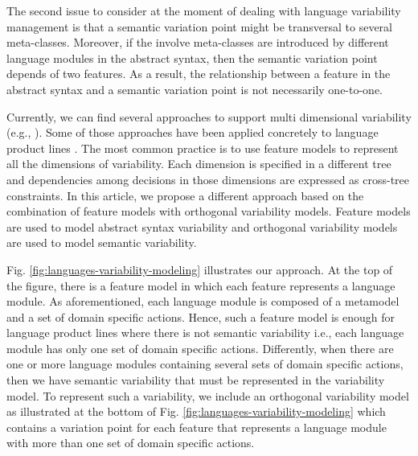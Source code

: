 The second issue to consider at the moment of dealing with language variability management is that a semantic variation point might be transversal to several meta-classes. Moreover, if the involve meta-classes are introduced by different language modules in the abstract syntax, then the semantic variation point depends of two features. As a result, the relationship between a feature in the abstract syntax and a semantic variation point is not necessarily one-to-one. 


Currently, we can find several approaches to support multi dimensional variability (e.g., \cite{Rosenmuller:2011}). Some of those approaches have been applied concretely to language product lines \cite{Liebig:2013}. The most common practice is to use feature models to represent all the dimensions of variability. Each dimension is specified in a different tree and dependencies among decisions in those dimensions are expressed as cross-tree constraints. In this article, we propose a different approach based on the combination of feature models with orthogonal variability models. Feature models are used to model abstract syntax variability and orthogonal variability models are used to model semantic variability.

Fig. \ref{fig:languages-variability-modeling} illustrates our approach. At the top of the figure, there is a feature model in which each feature represents a language module. As aforementioned, each language module is composed of a metamodel and a set of domain specific actions. Hence, such a feature model is enough for language product lines where there is not semantic variability i.e., each language module has only one set of domain specific actions. Differently, when there are one or more language modules containing several sets of domain specific actions, then we have semantic variability that must be represented in the variability model. To represent such a variability, we include an orthogonal variability model as illustrated at the bottom of Fig. \ref{fig:languages-variability-modeling} which contains a variation point for each feature that represents a language module with more than one set of domain specific actions.

